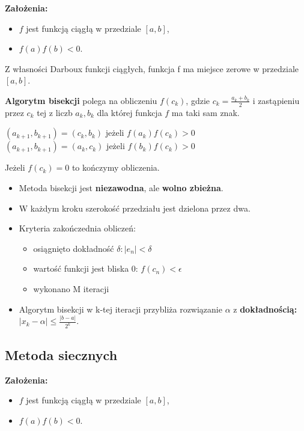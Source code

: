 \documentclass[12pt]{article}
\begin{document}
    \textbf{Założenia:}
    \begin{itemize}
        \item $f$ jest funkcją ciągłą w przedziale $[a,b]$,
        \item $f(a)f(b) < 0$.
    \end{itemize}
    Z własności Darboux funkcji ciągłych, funkcja f ma miejsce zerowe w przedziale $[a,b]$.

    \begin{definition}
        \textbf{Algorytm bisekcji} polega na obliczeniu $f(c_k)$, gdzie $c_k = \frac{a_k + b_k}{2}$ i zastąpieniu przez
        $c_k$ tej z liczb $a_k, b_k$ dla której funkcja $f$ ma taki sam znak.
        \begin{center}
            $(a_{k+1}, b_{k+1}) = (c_k, b_k)$ jeżeli $f(a_k)f(c_k) > 0$\\
            $(a_{k+1}, b_{k+1}) = (a_k, c_k)$ jeżeli $f(b_k)f(c_k) > 0$
        \end{center}
        Jeżeli $f(c_k) = 0$ to kończymy obliczenia.
    \end{definition}
    \begin{itemize}
        \item Metoda bisekcji jest \textbf{niezawodna}, ale \textbf{wolno zbieżna}.
        \item W każdym kroku szerokość przedziału jest dzielona przez dwa.
        \item Kryteria zakończednia obliczeń:
        \begin{itemize}
            \item osiągnięto dokładność $\delta: |e_n| < \delta$
            \item wartość funkcji jest bliska 0: $f(c_n) < \epsilon$
            \item wykonano M iteracji
        \end{itemize}
        \item Algorytm bisekcji w k-tej iteracji przybliża rozwiązanie $\alpha$ z \textbf{dokładnością:} $|x_k - \alpha| \leq \frac{|b - a|}{2^k}$.
    \end{itemize}


    \subsection{Metoda siecznych}

    \textbf{Założenia:}
    \begin{itemize}
        \item $f$ jest funkcją ciągłą w przedziale $[a,b]$,
        \item $f(a)f(b) < 0$.
    \end{itemize}
\end{document}
